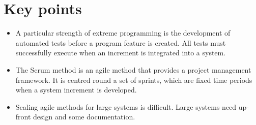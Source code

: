 \section{ Key points}
\begin{itemize}

\item A particular strength of extreme programming is the development of automated tests before a program feature is created. All tests must successfully execute when an increment is integrated into a system.

\item The Scrum method is an agile method that provides a project management framework. It is centred round a set of sprints, which are fixed time periods when a system increment is developed.

\item Scaling agile methods for large systems is difficult. Large systems need up-front design and some documentation.
\end{itemize}
